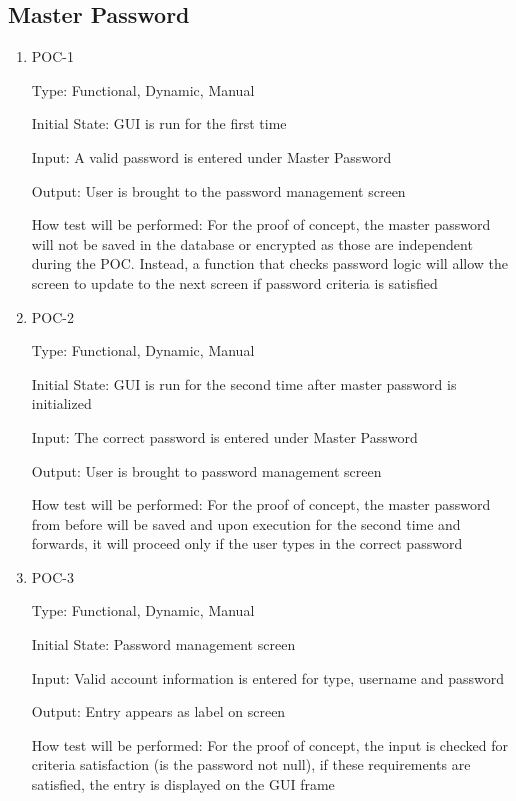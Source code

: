 \documentclass[12pt, titlepage]{article}
\begin{document}
\subsection{Master Password}

\begin{enumerate}

\item{POC-1\\}

Type: Functional, Dynamic, Manual

Initial State: GUI is run for the first time

Input: A valid password is entered under Master Password

Output: User is brought to the password management screen

How test will be performed: For the proof of concept, the master password will not be saved in the database or encrypted as those are independent during the POC. Instead, a function that checks password logic will allow the screen to update to the next screen if password criteria is satisfied

\item{POC-2\\}
					
Type: Functional, Dynamic, Manual

Initial State: GUI is run for the second time after master password is initialized

Input: The correct password is entered under Master Password

Output: User is brought to password management screen

How test will be performed: For the proof of concept, the master password from before will be saved and upon execution for the second time and forwards, it will proceed only if the user types in the correct password

\item{POC-3\\}

Type: Functional, Dynamic, Manual

Initial State: Password management screen

Input: Valid account information is entered for type, username and password

Output: Entry appears as label on screen 

How test will be performed: For the proof of concept, the input is checked for criteria satisfaction (is the password not null), if these requirements are satisfied, the entry is displayed on the GUI frame


\end{enumerate}
\end{document}

